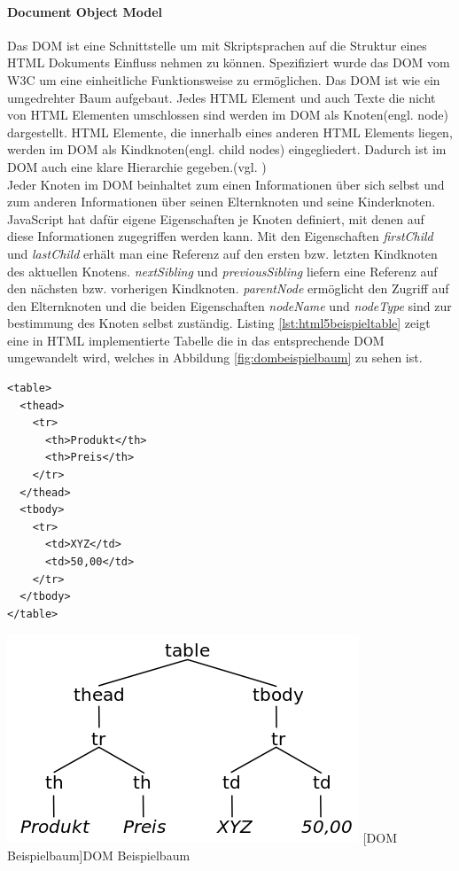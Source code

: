 \documentclass[12pt,a4paper,bibliography=totocnumbered,listof=totocnumbered]{scrartcl}
\begin{document}
\paragraph{Document Object Model} Das \ac{DOM} ist eine Schnittstelle um mit Skriptsprachen auf die Struktur eines HTML Dokuments Einfluss nehmen zu können. Spezifiziert wurde das DOM vom W3C um eine einheitliche Funktionsweise zu ermöglichen. Das DOM ist wie ein umgedrehter Baum aufgebaut. Jedes HTML Element und auch Texte die nicht von HTML Elementen umschlossen sind werden im DOM als Knoten(engl. node) dargestellt. HTML Elemente, die innerhalb eines anderen HTML Elements liegen, werden im DOM als Kindknoten(engl. child nodes) eingegliedert. Dadurch ist im DOM auch eine klare Hierarchie gegeben.(vgl. \cite[S.350]{WenzJava2008})\\Jeder Knoten im DOM beinhaltet zum einen Informationen über sich selbst und zum anderen Informationen über seinen Elternknoten und seine Kinderknoten. JavaScript hat dafür eigene Eigenschaften je Knoten definiert, mit denen auf diese Informationen zugegriffen werden kann. Mit den Eigenschaften \textit{firstChild} und \textit{lastChild} erhält man eine Referenz auf den ersten bzw. letzten Kindknoten des aktuellen Knotens. \textit{nextSibling} und \textit{previousSibling} liefern eine Referenz auf den nächsten bzw. vorherigen Kindknoten. \textit{parentNode} ermöglicht den Zugriff auf den Elternknoten und die beiden Eigenschaften \textit{nodeName} und \textit{nodeType} sind zur bestimmung des Knoten selbst zuständig. Listing \ref{lst:html5beispieltable} zeigt eine in HTML implementierte Tabelle die in das entsprechende DOM umgewandelt wird, welches in Abbildung \ref{fig:dombeispielbaum} zu sehen ist.

	\vspace{1em}
	\begin{lstlisting}[caption=DOM5 Beispiel Definition, label=lst:html5beispieltable]
<table>
  <thead>
    <tr>
      <th>Produkt</th>
      <th>Preis</th>
    </tr>
  </thead>
  <tbody>
    <tr>
      <td>XYZ</td>
      <td>50,00</td>
    </tr>
  </tbody>
</table>
	\end{lstlisting}

	\vspace{1em}
	\begin{minipage}{\linewidth}
		\centering
		\includegraphics[width=0.5\linewidth]{images/dom_sampletree.png}
		[DOM Beispielbaum]{DOM Beispielbaum}
		\label{fig:dombeispielbaum}
	\end{minipage}
\end{document}
